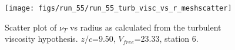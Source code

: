 \begin{figure}[H]
\centering
\texttt{[image: figs/run\_55/run\_55\_turb\_visc\_vs\_r\_meshscatter]}
\caption{Scatter plot of $\nu_T$ vs radius as calculated from the turbulent viscosity hypothesis. $z/c$=9.50, $V_{free}$=23.33, station 6.}
\label{fig:run_55_turb_visc_vs_r_meshscatter}
\end{figure}



